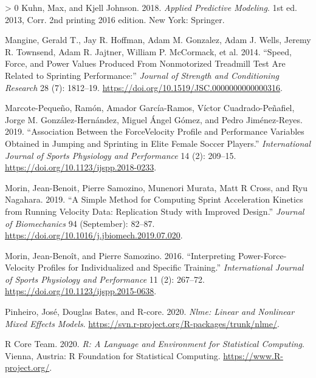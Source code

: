 \documentclass[fleqn,10pt,lineno]{wlpeerj} %
\newlength{\cslhangindent}
\newenvironment{CSLReferences}[3] %
 {%
  \setlength{\parindent}{0pt}
  \ifodd #1 \everypar{\setlength{\hangindent}{\cslhangindent}}\ignorespaces\fi
  \ifnum #2 > 0
  \setlength{\parskip}{#2\baselineskip}
  \fi
 }%
 {}
\begin{document}
\begin{CSLReferences}{1}{0}
\leavevmode\hypertarget{ref-kuhnAppliedPredictiveModeling2018}{}%
Kuhn, Max, and Kjell Johnson. 2018. \emph{Applied {Predictive Modeling}}. 1st ed. 2013, Corr. 2nd printing 2016 edition. {New York}: {Springer}.

\leavevmode\hypertarget{ref-mangineSpeedForcePower2014}{}%
Mangine, Gerald T., Jay R. Hoffman, Adam M. Gonzalez, Adam J. Wells, Jeremy R. Townsend, Adam R. Jajtner, William P. McCormack, et al. 2014. {``Speed, {Force}, and {Power Values Produced From Nonmotorized Treadmill Test Are Related} to {Sprinting Performance}:''} \emph{Journal of Strength and Conditioning Research} 28 (7): 1812--19. \url{https://doi.org/10.1519/JSC.0000000000000316}.

\leavevmode\hypertarget{ref-marcote-pequenoAssociationForceVelocity2019}{}%
Marcote-Pequeño, Ramón, Amador García-Ramos, Víctor Cuadrado-Peñafiel, Jorge M. González-Hernández, Miguel Ángel Gómez, and Pedro Jiménez-Reyes. 2019. {``Association {Between} the {Force}{{Velocity Profile}} and {Performance Variables Obtained} in {Jumping} and {Sprinting} in {Elite Female Soccer Players}.''} \emph{International Journal of Sports Physiology and Performance} 14 (2): 209--15. \url{https://doi.org/10.1123/ijspp.2018-0233}.

\leavevmode\hypertarget{ref-morinSimpleMethodComputing2019}{}%
Morin, Jean-Benoit, Pierre Samozino, Munenori Murata, Matt R Cross, and Ryu Nagahara. 2019. {``A Simple Method for Computing Sprint Acceleration Kinetics from Running Velocity Data: {Replication} Study with Improved Design.''} \emph{Journal of Biomechanics} 94 (September): 82--87. \url{https://doi.org/10.1016/j.jbiomech.2019.07.020}.

\leavevmode\hypertarget{ref-morinInterpretingPowerForceVelocityProfiles2016}{}%
Morin, Jean-Benoît, and Pierre Samozino. 2016. {``Interpreting {Power}-{Force}-{Velocity Profiles} for {Individualized} and {Specific Training}.''} \emph{International Journal of Sports Physiology and Performance} 11 (2): 267--72. \url{https://doi.org/10.1123/ijspp.2015-0638}.

\leavevmode\hypertarget{ref-R-nlme}{}%
Pinheiro, José, Douglas Bates, and R-core. 2020. \emph{Nlme: Linear and Nonlinear Mixed Effects Models}. \url{https://svn.r-project.org/R-packages/trunk/nlme/}.

\leavevmode\hypertarget{ref-R-base}{}%
R Core Team. 2020. \emph{R: A Language and Environment for Statistical Computing}. Vienna, Austria: R Foundation for Statistical Computing. \url{https://www.R-project.org/}.


\end{CSLReferences}
\end{document}
